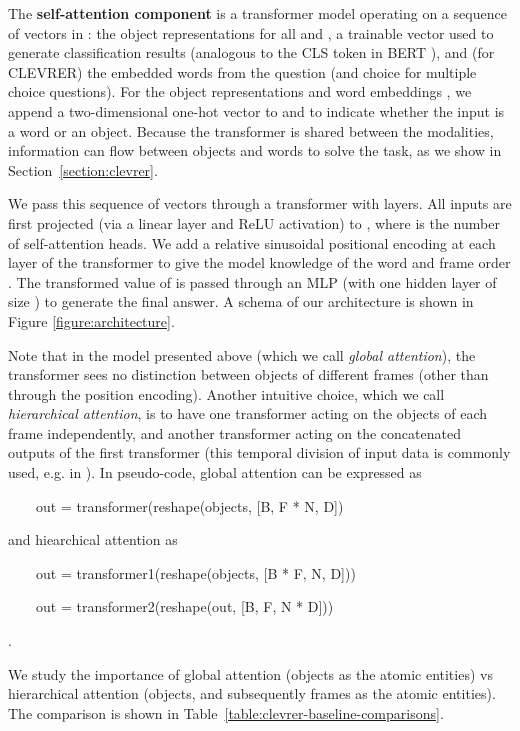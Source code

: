 \documentclass{article}
\begin{document}
The \textbf{self-attention component} is a transformer model \citep{vaswani2017attention}
operating on a sequence of vectors in :
the object representations  for all  and ,
a trainable vector  used to generate classification results
(analogous to the CLS token in BERT \citep{devlin2018bert}),
and (for CLEVRER) the embedded words 
    from the question (and choice for multiple choice questions).
For the object representations  and word embeddings ,
we append a two-dimensional one-hot vector to  and 
to indicate whether the input is a word or an object.
Because the transformer is shared between the modalities,
information can flow between objects and words to solve the task,
as we show in Section~\ref{section:clevrer}.

We pass this sequence of vectors
through a transformer with  layers.
All inputs are first projected (via a linear layer and ReLU activation) to , where  is the number of self-attention heads.
We add a relative sinusoidal positional encoding at each layer of the transformer
to give the model knowledge of the word and frame order \citep{dai2019transformer}.
The transformed value of  is passed through an MLP (with one hidden layer of size ) to generate the final answer.
A schema of our architecture is shown in Figure \ref{figure:architecture}.



Note that in the model presented above (which we call \emph{global attention}), the transformer sees no distinction between objects of different frames (other than through the position encoding).
Another intuitive choice, which we call \emph{hierarchical attention},
is to have one transformer acting on the objects of each frame independently,
and another transformer acting on the concatenated outputs of the first transformer (this temporal division of input data is commonly used, e.g. in \citep{sun-videobert}).
In pseudo-code, global attention can be expressed as

{
\ttfamily
\small
\ \ \ \   out = transformer(reshape(objects, [B, F * N, D])
}

and hiearchical attention as

{
\ttfamily
\small
\ \ \ \  out = transformer1(reshape(objects, [B * F, N, D]))

\ \ \ \  out = transformer2(reshape(out, [B, F, N * D]))
}.

We study the importance of global attention (objects as the atomic entities) vs hierarchical attention (objects, and subsequently frames as the atomic entities).
The comparison is shown in Table~\ref{table:clevrer-baseline-comparisons}.
\end{document}
